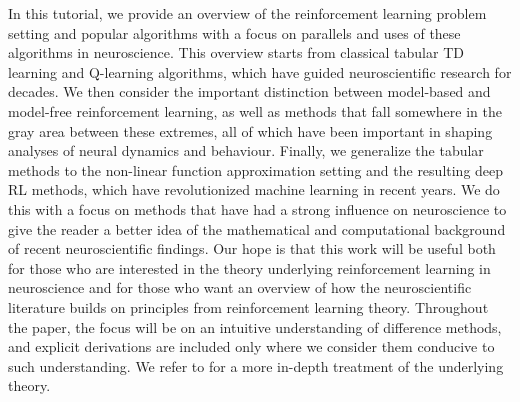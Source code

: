 In this tutorial, we provide an overview of the reinforcement learning problem setting and popular algorithms with a focus on parallels and uses of these algorithms in neuroscience.
This overview starts from classical tabular TD learning and Q-learning algorithms, which have guided neuroscientific research for decades.
We then consider the important distinction between model-based and model-free reinforcement learning, as well as methods that fall somewhere in the gray area between these extremes, all of which have been important in shaping analyses of neural dynamics and behaviour.
Finally, we generalize the tabular methods to the non-linear function approximation setting and the resulting deep RL methods, which have revolutionized machine learning in recent years.
We do this with a focus on methods that have had a strong influence on neuroscience to give the reader a better idea of the mathematical and computational background of recent neuroscientific findings.
Our hope is that this work will be useful both for those who are interested in the theory underlying reinforcement learning in neuroscience and for those who want an overview of how the neuroscientific literature builds on principles from reinforcement learning theory.
Throughout the paper, the focus will be on an intuitive understanding of difference methods, and explicit derivations are included only where we consider them conducive to such understanding.
We refer to \citet{sutton2018reinforcement} for a more in-depth treatment of the underlying theory.


